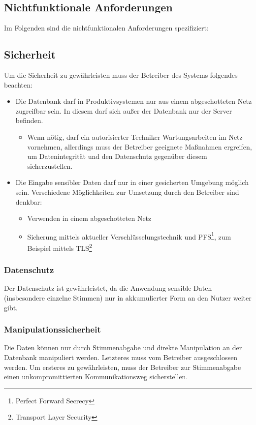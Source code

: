 \documentclass[a4paper]{scrreprt}
\begin{document}
\subsection{Nichtfunktionale Anforderungen}
Im Folgenden sind die nichtfunktionalen Anforderungen spezifiziert:

\subsection{Sicherheit}
Um die Sicherheit zu gewährleisten muss der Betreiber des Systems folgendes beachten:
\begin{itemize}
  \item Die Datenbank darf in Produktivsystemen nur aus einem abgeschotteten Netz zugreifbar sein.
  	In diesem darf sich außer der Datenbank nur der Server befinden.
    \begin{itemize}
    	\item Wenn nötig, darf ein autorisierter Techniker Wartungsarbeiten im Netz vornehmen, allerdings muss der Betreiber geeignete Maßnahmen ergreifen, um Datenintegrität und den Datenschutz gegenüber diesem sicherzustellen.
    \end{itemize}
  \item Die Eingabe sensibler Daten darf nur in einer gesicherten Umgebung möglich sein.
  	Verschiedene Möglichkeiten zur Umsetzung durch den Betreiber sind denkbar:
    \begin{itemize}
      \item Verwenden in einem abgeschotteten Netz
      \item Sicherung mittels aktueller Verschlüsselungstechnik und PFS\footnote{Perfect Forward Secrecy}, zum Beispiel mittels TLS\footnote{Transport Layer Security}
    \end{itemize}
\end{itemize}

\subsubsection{Datenschutz}
Der Datenschutz ist gewährleistet, da die Anwendung sensible Daten (insbesondere einzelne Stimmen) nur in akkumulierter Form an den Nutzer weiter gibt.

\subsubsection{Manipulationssicherheit}
Die Daten können nur durch Stimmenabgabe und direkte Manipulation an der Datenbank manipuliert werden.
Letzteres muss vom Betreiber ausgeschlossen werden.
Um ersteres zu gewährleisten, muss der Betreiber zur Stimmenabgabe einen unkompromittierten Kommunikationsweg sicherstellen.
\end{document}
